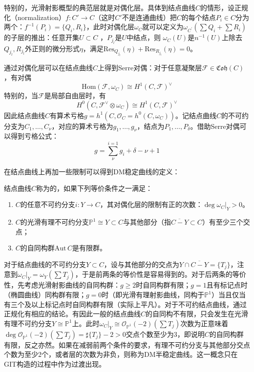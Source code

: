 特别的，光滑射影概型的典范层就是对偶化层。具体到结点曲线$ C $的情形，设正规化（normalization）$ f:C'\to C $（这时$ C'  $不是连通曲线）把$ C $的每个结点$ P_i \in C $分为两个：$ f^{-1}(P_i)=\{Q_i,R_i\} $，此时对偶化层$ \omega_C $就可以定义为$ \omega_{C^\prime}(\sum Q_i+\sum R_i) $的子层的推出：任意开集$ U\subset C $ ，$ P_{j_l} $是$ U $中结点，则 $\omega_C(U)$是$ n^{-1}(U) $上除去$ Q_{j_l},R_{j_l} $外正则的微分形式$ \eta $，满足$ \mathrm{Res}_{Q_{j_l}} (\eta)+\mathrm{Res}_{R_{j_l}} (\eta)=0$。

通过对偶化层可以在结点曲线$ C $上得到Serre对偶：对于任意凝聚层$ \mathscr{F}\in \mathfrak{Coh}(C) $，有对偶
$$ \mathrm{Hom}(\mathscr{F},\omega_C)\cong H^1(C,\mathscr{F})^\vee $$
特别的，当$ \mathscr{F} $是局部自由层时，有
$$ H^0(C,\mathscr{F}^\vee\otimes \omega_C)\cong H^1(C,\mathscr{F})^\vee $$
因此结点曲线$ C $有算术亏格$ g=h^1(C,\mathscr{O}_C=h^0(C,\omega_C)) $。记结点曲线$ C $的不可约分支为$ C_1,\ldots,C_\nu $，对应的算术亏格为$ g_1,\ldots,g_\nu $，结点为$ P_1,\ldots,P_\delta $。借助Serre对偶可以得到亏格公式：
$$ g=\sum_{\nu}^{i=1}g_i +\delta -\nu+1  $$

在结点曲线上再加一些限制可以得到DM稳定曲线的定义：
\begin{definition}
	结点曲线$ C $称为的，如果下列等价条件之一满足：
	\begin{enumerate}
		\item $ C $的任意不可约分支$ i:Y\to C$，其对偶化层的限制有正的次数：$ \deg \omega_C|_{Y} >0 $。
		\item $ C $的光滑有理不可约分支$ \mathbb{P}^1\cong Y \subset C $与其他部分（指$ \overline{C-Y}\subset C $）有至少三个交点；
		\item $ C $的自同构群$ \mathrm{Aut}\,C $是有限群。
	\end{enumerate}
\end{definition}

对于结点曲线的不可约分支$ Y\subset C $，设与其他部分的交点为$ Y\cap \overline{C-Y}=\{ T_j\} $，注意到$ \omega_C|_{Y}=\omega_Y(\sum T_j) $，于是前两条的等价性是容易得到的。对于后两条的等价性，先考虑光滑射影曲线的自同构群：$ g\geqslant2 $时自同构群有限；$ g=1 $且有标记点时（椭圆曲线）同构群有限；$ g=0 $时（即光滑有理射影曲线，同构于$ \mathbb{P}^1 $）当且仅当有三个及以上标记点时自同构群有限（实际上平凡）。对于不可约结点曲线，通过正规化有相应的结论。有因此一般的结点曲线$ C $的自同构不有限，只会发生在光滑有理不可约分支$ Y \cong \mathbb{P}^1 $上。此时$\omega_C|_{Y}\cong \mathscr{O}_{\mathbb{P}^1}(-2)(\sum T_j) $次数为正意味着$ \deg\mathscr{O}_{\mathbb{P}^1}(-2)(\sum T_j)=\sharp\{T_j\}-2>0 $交点个数至少为3，即说明$ C $的自同构群有限，反之亦然。如果在减弱前两个条件的要求，有理不可约分支与其他部分交点个数为至少2个，或者层的次数为非负，则称为DM半稳定曲线。这一概念只在GIT构造的过程中作为过渡出现。


